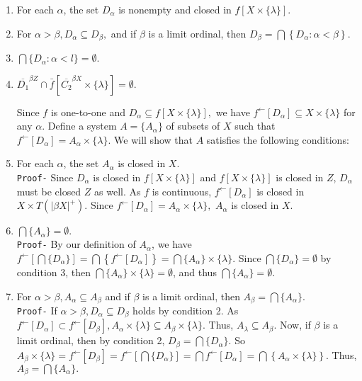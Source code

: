 \documentclass{article}
\begin{document}
\begin{enumerate}
	\item For each $\alpha$, the set $D_\alpha$ is nonempty and closed in $f\left[X\times \{\lambda\}\right].$
	\item For $\alpha>\beta, D_\alpha\subseteq D_\beta,$ and if $\beta$ is a limit ordinal, then $D_\beta=\bigcap\left\{ D_\alpha: \alpha< \beta\right\}$.
	\item $\bigcap \{D_\alpha:\alpha<l\}=\emptyset$.
	\item $\overline{D_1}^{\beta Z} \cap \bar{f}\left[\overline{C_2}^{\beta X} \times \{\lambda\}\right]=\emptyset.$

\vskip 30pt


Since $f$ is one-to-one and $D_\alpha\subseteq f\left[X\times \{\lambda\}\right],$ we have $ f^{\leftarrow}\left[D_\alpha\right]\subseteq X\times\{\lambda\}$ for any $\alpha$. Define a system $A=\{A_\alpha\}$ of subsets of $X$ such that $f^{\leftarrow}\left[D_\alpha\right]=A_\alpha\times\{\lambda\}.$ We will show that $A$ satisfies the following conditions: 


\vskip 25pt


	\item For each $\alpha$, the set $A_\alpha$ is closed in $X$.\\
	\texttt{Proof-} Since $D_\alpha$ is closed in $f\left[X\times\{\lambda\}\right]$ and $f\left[X\times\{\lambda\}\right]$ is closed in $Z$, $D_\alpha$ must be closed $Z$ as well. As $f$ is continuous, $f^{\leftarrow}\left[D_\alpha\right]$ is closed in $X\times T(|\beta X|^+).$ Since $f^{\leftarrow}\left[D_\alpha\right]=A_\alpha \times \{\lambda\},$  $A_\alpha$ is closed in $X$. \
	
	
\vskip 20pt	
	
	
	\item $\bigcap\{A_\alpha\}=\emptyset.$\\
	\texttt{Proof-} By our definition of $A_\alpha$, we have $f^{\leftarrow}\left[\bigcap\{D_\alpha\}\right]=\bigcap\left\{f^{\leftarrow}\left[D_\alpha\right]\right\}=\bigcap \{A_\alpha\}\times\{\lambda\}.$ Since $\bigcap \{D_\alpha\}=\emptyset $ by condition 3, then $\bigcap \{A_\alpha\}\times\{\lambda\}= \emptyset$, and thus $\bigcap \{A_\alpha\}= \emptyset.$
	
	
\vskip 20pt	
	
	\item For $\alpha>\beta, A_\alpha \subseteq A_\beta$ and if $\beta$ is a limit ordinal, then $A_\beta=\bigcap\{A_\alpha\}.$\\
	\texttt{Proof-} If $\alpha>\beta, D_\alpha\subseteq D_\beta$ holds by condition 2. As $f^{\leftarrow}\left[D_\alpha\right]\subset f^{\leftarrow}\left[D_\beta\right], A_\alpha\times \{\lambda\} \subseteq A_\beta\times \{\lambda\}$. Thus, $A_\lambda \subseteq A_\beta.$ Now, if $\beta$ is a limit ordinal, then by condition 2, $D_\beta=\bigcap \{D_\alpha\}.$ So $A_\beta\times\{\lambda\}=f^{\leftarrow}\left[D_\beta\right]=f^{\leftarrow}\left[\bigcap\{D_\alpha\}\right]=\bigcap f^{\leftarrow}\left[D_\alpha\right]=\bigcap \left\{A_\alpha\times \{\lambda\}\right\}.$ Thus, $A_\beta=\bigcap \{A_\alpha\}.$
	

\end{enumerate}
\end{document}
